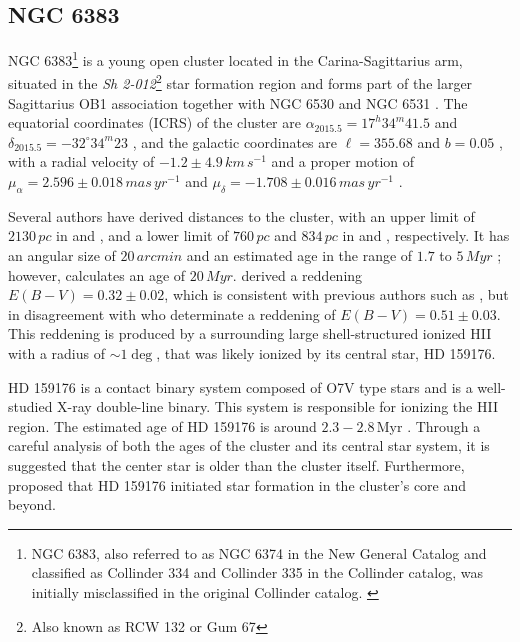 \documentclass[fleqn,usenatbib,usedcolumn,useAMS]{mnras}
\newcommand{\kms}{\,km\,s^{-1}} %
\begin{document}
\subsection{NGC 6383}

NGC 6383\footnote{NGC 6383, also referred to as NGC 6374 in the New General Catalog and classified as Collinder 334 and Collinder 335 in the Collinder catalog, was initially misclassified in the original Collinder catalog. \citep{1931AnLun...2....1C}} is a young open cluster located in the Carina-Sagittarius arm, situated in the \textit{Sh 2-012}\footnote{Also known as RCW 132 \citep{1960MNRAS.121..103R} or Gum 67} star formation region and forms part of the larger Sagittarius OB1 association together with NGC 6530 and NGC 6531 \citep{2008hsf2.book..497R}. The equatorial coordinates (ICRS)  of the cluster are $\alpha_{2015.5} = 17^h34^m41.5$ and $\delta_{2015.5} = -32^\circ34^m23$ \citep{2020A&A...633A..99C}, and the galactic coordinates are $\ell = 355.68$ and $b= 0.05$ \citep{2017A&A...600A.106C}, with a radial velocity of $-1.2 \pm 4.9\kms$ \citep{2017A&A...600A.106C} and a proper motion of $\mu_\alpha = 2.596 \pm 0.018\,mas\,yr^{-1}$ and $\mu_\delta = -1.708\pm 0.016\, mas\,yr^{-1}$ \citep{2020A&A...633A..99C}.

Several authors have derived distances to the cluster, with an upper limit of $2130\,pc$ in \citet{1930LicOB..14..154T} and \citet{1937LicOB..18...89Z}, and a lower limit of $760\,pc$ and $834\,pc$ in \citet{1949ApJ...110..117S} and \citet{2018A&A...610A..30A}, respectively. It has an angular size of $20\,arcmin$ \citep{2013A&A...560A..76M} and an estimated age in the range of $1.7$ to $5\,Myr$ \citep{1978MNRAS.182..607F,1989MNRAS.236..263P,1991MNRAS.249...76B,2005A&A...438.1163K,2007A&A...462..157P}; however, \citet{1968ArA.....5....1L} calculates an age of $20\,Myr$. \citet{2008hsf2.book..497R} derived a reddening $E(B-V) = 0.32 \pm 0.02$, which is consistent with previous authors such as \citet{1971A&AS....4..241B,1978MNRAS.182..607F,1978MNRAS.184..661L,1985A&A...151..391T,1989MNRAS.236..263P,1994RMxAA..29..141F,2007A&A...462..157P}, but in disagreement with \citet{2018A&A...610A..30A} who determinate a reddening of $E(B-V) = 0.51 \pm 0.03$. This reddening is produced by a surrounding large shell-structured ionized HII with a radius of $\sim 1\deg$, that was likely ionized by its central star, HD 159176. 

HD 159176 is a contact binary system composed of O7V type stars and is a well-studied X-ray double-line binary. This system is responsible for ionizing the HII region. The estimated age of HD 159176 is around $2.3-2.8$\,Myr \citep{2010A&A...511A..25R}. Through a careful analysis of both the ages of the cluster and its central star system, it is suggested that the center star is older than the cluster itself. Furthermore, \citet{1978MNRAS.182..607F} proposed that HD 159176 initiated star formation in the cluster's core and beyond.
\end{document}
